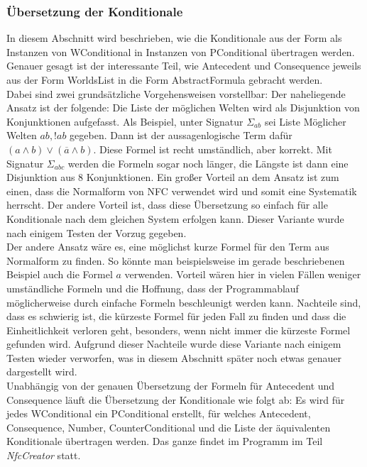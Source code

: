 \documentclass[12pt,a4paper]{article}
\begin{document}
\subsubsection{Übersetzung der Konditionale}
\label{sec:übersetzung}
In diesem Abschnitt wird beschrieben, wie die Konditionale aus der Form als Instanzen von WConditional in Instanzen von PConditional übertragen werden. Genauer gesagt ist der interessante Teil, wie Antecedent und Consequence jeweils aus der Form WorldsList in die Form AbstractFormula gebracht werden. \\
Dabei sind zwei grundsätzliche Vorgehensweisen vorstellbar: Der naheliegende Ansatz ist der folgende: Die Liste der möglichen Welten wird als Disjunktion von Konjunktionen aufgefasst. Als Beispiel, unter Signatur $\Sigma_{ab}$ sei Liste Möglicher Welten $ab, !ab$ gegeben. Dann ist der aussagenlogische Term dafür $(a \wedge b) \vee (\overline{a}\wedge b)$. Diese Formel ist recht umständlich, aber korrekt. Mit Signatur $\Sigma_{abc}$  werden die Formeln sogar noch länger, die Längste ist dann eine Disjunktion aus 8 Konjunktionen. Ein großer Vorteil an dem Ansatz ist zum einen, dass die Normalform von NFC verwendet wird und somit eine Systematik herrscht. Der andere Vorteil ist, dass diese Übersetzung so einfach für alle Konditionale nach dem gleichen System erfolgen kann. Dieser Variante wurde nach einigem Testen der Vorzug gegeben.\\
Der andere Ansatz wäre es, eine möglichst kurze Formel für den Term aus Normalform zu finden. So könnte man beispielsweise im gerade beschriebenen Beispiel auch die Formel $a$ verwenden. Vorteil wären hier in vielen Fällen weniger umständliche Formeln und die Hoffnung, dass der Programmablauf möglicherweise durch einfache Formeln beschleunigt werden kann. Nachteile sind, dass es schwierig ist, die kürzeste Formel für jeden Fall zu finden und dass die Einheitlichkeit verloren geht, besonders, wenn nicht immer die kürzeste Formel gefunden wird. Aufgrund dieser Nachteile wurde diese Variante nach einigem Testen wieder verworfen, was in diesem Abschnitt später noch etwas genauer dargestellt wird.\\
Unabhängig von der genauen Übersetzung der Formeln für Antecedent und Consequence läuft die Übersetzung der Konditionale wie folgt ab: Es wird für jedes WConditional ein PConditional erstellt, für welches Antecedent, Consequence, Number, CounterConditional und die Liste der äquivalenten Konditionale übertragen werden. Das ganze findet im Programm im Teil \textit{NfcCreator} statt. \\
\end{document}
